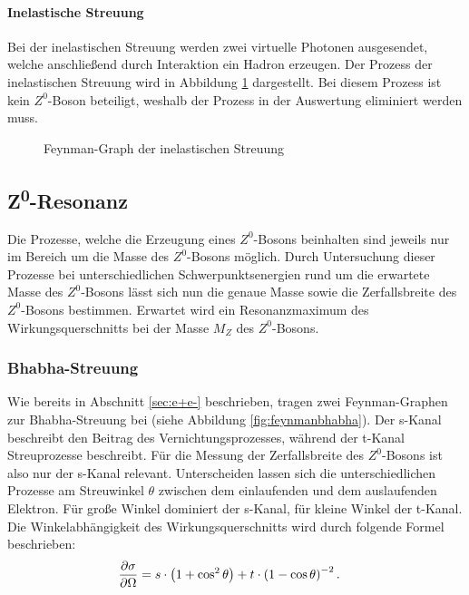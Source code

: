 \paragraph{Inelastische Streuung}
Bei der inelastischen Streuung werden zwei virtuelle Photonen ausgesendet, welche anschließend durch Interaktion ein Hadron erzeugen. Der Prozess der inelastischen Streuung wird in Abbildung \ref{fig:feynmaninelastisch} dargestellt. Bei diesem Prozess ist kein $Z^0$-Boson beteiligt, weshalb der Prozess in der Auswertung eliminiert werden muss.

\begin{figure}
	\centering
	\caption{Feynman-Graph der inelastischen Streuung}
	\label{fig:feynmaninelastisch}
\end{figure}

\subsection{Z\textsuperscript0-Resonanz}

Die Prozesse, welche die Erzeugung eines $Z^0$-Bosons beinhalten sind jeweils nur im Bereich um die Masse des $Z^0$-Bosons möglich. Durch Untersuchung dieser Prozesse bei unterschiedlichen Schwerpunktsenergien rund um die erwartete Masse des $Z^0$-Bosons lässt sich nun die genaue Masse sowie die Zerfallsbreite des $Z^0$-Bosons bestimmen. Erwartet wird ein Resonanzmaximum des Wirkungsquerschnitts bei der Masse $M_Z$ des $Z^0$-Bosons. \cite{povh}

\subsubsection{Bhabha-Streuung}\label{sec:bhabha}

Wie bereits in Abschnitt \ref{sec:e+e-} beschrieben, tragen zwei Feynman-Graphen zur Bhabha-Streuung bei (siehe Abbildung \ref{fig:feynmanbhabha}). Der s-Kanal beschreibt den Beitrag des Vernichtungsprozesses, während der t-Kanal Streuprozesse beschreibt. Für die Messung der Zerfallsbreite des $Z^0$-Bosons ist also nur der s-Kanal relevant. Unterscheiden lassen sich die unterschiedlichen Prozesse am Streuwinkel $\theta$ zwischen dem einlaufenden und dem auslaufenden Elektron. Für große Winkel dominiert der s-Kanal, für kleine Winkel der t-Kanal. Die Winkelabhängigkeit des Wirkungsquerschnitts wird durch folgende Formel beschrieben:
\begin{align}
	\del[\sigma]{\Omega}&=s\cdot\left(1+\cos^2\theta\right)+t\cdot\left(1-\cos\theta\right)^{-2}\text{.}\label{eq:stkanal}
\end{align}

